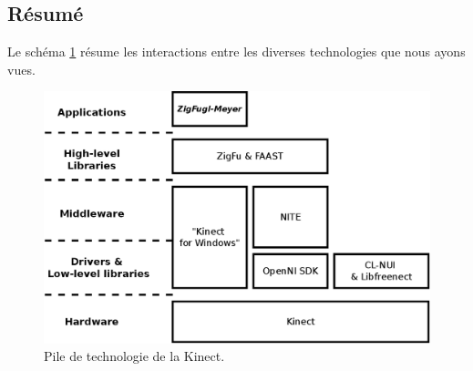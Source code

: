\subsection{Résumé}
Le schéma \ref{fig:technology_overview} résume les interactions entre les diverses 
technologies que nous ayons vues.

\begin{figure}[h!]
\centering
\includegraphics[width=0.9\linewidth]{images/technology_overview}
\caption{Pile de technologie de la Kinect.}
\label{fig:technology_overview}
\end{figure}
